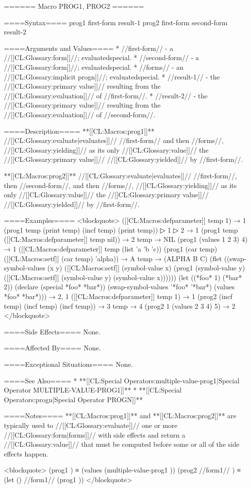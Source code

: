 ====== Macro PROG1, PROG2 ======

====Syntax====
\DefmacWithValues prog1 {first-form } {result-1} \DefmacWithValues prog2 {first-form second-form } {result-2}

====Arguments and Values====
  * //first-form// - a //[[CL:Glossary:form]]//; evaluatedspecial.
  * //second-form// - a //[[CL:Glossary:form]]//; evaluatedspecial.
  * //forms// - an //[[CL:Glossary:implicit progn]]//; evaluatedspecial.
  * //result-1// - the //[[CL:Glossary:primary value]]// resulting from the //[[CL:Glossary:evaluation]]// of //first-form//.
  * //result-2// - the //[[CL:Glossary:primary value]]// resulting from the //[[CL:Glossary:evaluation]]// of //second-form//.

====Description====
**[[CL:Macros:prog1]]** //[[CL:Glossary:evaluate|evaluates]]// //first-form// and then //forms//, //[[CL:Glossary:yielding]]// as its only //[[CL:Glossary:value]]// the //[[CL:Glossary:primary value]]// //[[CL:Glossary:yielded]]// by //first-form//.

**[[CL:Macros:prog2]]** //[[CL:Glossary:evaluate|evaluates]]// //first-form//, then //second-form//, and then //forms//, //[[CL:Glossary:yielding]]// as its only //[[CL:Glossary:value]]// the //[[CL:Glossary:primary value]]// //[[CL:Glossary:yielded]]// by //first-form//.

====Examples====
<blockquote> ([[CL:Macros:defparameter]] temp 1) → 1 (prog1 temp (print temp) (incf temp) (print temp))
▷ 1
▷ 2 → 1 (prog1 temp ([[CL:Macros:defparameter]] temp nil)) → 2 temp → NIL (prog1 (values 1 2 3) 4) → 1 ([[CL:Macros:defparameter]] temp (list 'a 'b 'c)) (prog1 (car temp) ([[CL:Macros:setf]] (car temp) 'alpha)) → A temp → (ALPHA B C) (flet ((swap-symbol-values (x y) ([[CL:Macros:setf]] (symbol-value x) (prog1 (symbol-value y) ([[CL:Macros:setf]] (symbol-value y) (symbol-value x)))))) (let ((*foo* 1) (*bar* 2)) (declare (special *foo* *bar*)) (swap-symbol-values '*foo* '*bar*) (values *foo* *bar*))) → 2, 1 ([[CL:Macros:defparameter]] temp 1) → 1 (prog2 (incf temp) (incf temp) (incf temp)) → 3 temp → 4 (prog2 1 (values 2 3 4) 5) → 2 </blockquote>

====Side Effects====
None.

====Affected By====
None.

====Exceptional Situations====
None.

====See Also====
  * **[[CL:Special Operators:multiple-value-prog1|Special Operator MULTIPLE-VALUE-PROG1]]**
  * **[[CL:Special Operators:progn|Special Operator PROGN]]**

====Notes====
**[[CL:Macros:prog1]]** and **[[CL:Macros:prog2]]** are typically used to //[[CL:Glossary:evaluate]]// one or more //[[CL:Glossary:form|forms]]// with side effects and return a //[[CL:Glossary:value]]// that must be computed before some or all of the side effects happen.

<blockquote> (prog1 ) ≡ (values (multiple-value-prog1 )) (prog2 //form1// ) ≡ (let () //form1// (prog1 )) </blockquote>


